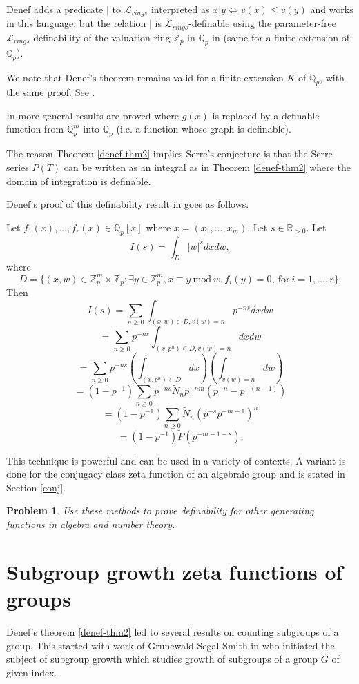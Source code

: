 \documentclass[12pt]{amsart}
\def\R{\mathbb{R}}
\def\Z{\mathbb{Z}}
\def\cL{\mathcal{L}}
\def\R{\mathbb{R}}
\def\Q{\mathbb{Q}}
\def\cL{\mathcal{L}}
\numberwithin{equation}{section}
\newtheorem{prob}{Problem}[section]
\begin{document}
Denef adds a predicate $|$ to $\cL_{rings}$ interpreted as $x |y \Leftrightarrow v(x) \leq v(y)$ and works in this language, 
but the relation $|$ is $\cL_{rings}$-definable using the parameter-free $\cL_{rings}$-definability of the valuation ring 
$\Z_p$ in $\Q_p$ in\cite{CDLM} (same for a finite extension of $\Q_p$). 

We note that Denef's theorem remains valid
for a finite extension $K$ of $\Q_p$, with the same proof. See \cite{denef-surv}.

In \cite{Denefrationality} more general results are proved where $g(x)$ is replaced by a definable function from $\Q_p^m$ into $\Q_p$ (i.e. a function whose graph is definable).

The reason Theorem \ref{denef-thm2} implies Serre's conjecture is that the Serre series $\tilde{P}(T)$ can be 
written as an integral as in Theorem \ref{denef-thm2} where the domain of integration is definable. 

Denef's proof of this definability result in \cite{Denefrationality} goes as follows. 



Let $f_1(x),\dots,f_r(x) \in \Q_p[x]$ where $x=(x_1,\dots,x_m)$. Let $s\in \R_{>0}$. Let
$$I(s)=\int_D |w|^s dx dw,$$
where 
$$D=\{(x,w)\in \Z_p^m \times \Z_p: \exists y \in \Z_p^m, x\equiv y \ \mathrm{ mod} \ w, f_i(y)=0, \ \mathrm{for} \ i=1,\dots,r\}.$$
Then 
$$I(s)=\sum_{n\geq 0} \int_{(x,w)\in D, v(w)=n} p^{-ns} dxdw$$
$$=\sum_{n\geq 0} p^{-ns} \int_{(x,p^n)\in D, v(w)=n} dx dw$$
$$=\sum_{n\geq 0} p^{-ns} (\int_{(x,p^n)\in D} dx)(\int_{v(w)=n} dw)$$
$$=(1-p^{-1}) \sum_{n\geq 0} p^{-ns} \tilde{N}_n p^{-nm}(p^{-n}-p^{-(n+1)})$$ 
$$=(1-p^{-1})\sum_{n\geq 0} \tilde{N}_n(p^{-s}p^{-m-1})^n$$
$$=(1-p^{-1})\tilde{P}(p^{-m-1-s}).$$

This technique is powerful and can be used in a variety of contexts. A variant is done for the conjugacy class zeta function of an algebraic group and is stated in Section \ref{conj}. 

\begin{prob} Use these methods to prove definability for other generating functions in algebra and number theory.
\end{prob}

\section{\bf Subgroup growth zeta functions of groups}\label{growth}
Denef's theorem \ref{denef-thm2} led to several results on counting subgroups of a group. This started with work of 
Grunewald-Segal-Smith in \cite{GSS} who initiated the subject of subgroup growth which studies
growth of subgroups of a group $G$ of given index. 
\end{document}
